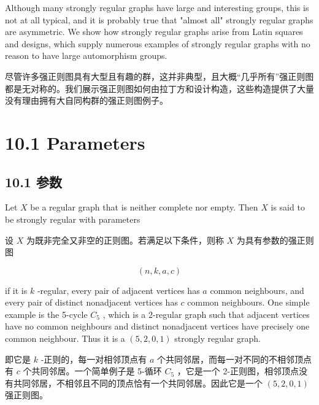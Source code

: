 \documentclass[10pt]{article}
\begin{document}
Although many strongly regular graphs have large and interesting groups, this is not at all typical, and it is probably true that "almost all" strongly regular graphs are asymmetric. We show how strongly regular graphs arise from Latin squares and designs, which supply numerous examples of strongly regular graphs with no reason to have large automorphism groups.

\begin{tcolorbox}\relax
尽管许多强正则图具有大型且有趣的群，这并非典型，且大概“几乎所有”强正则图都是无对称的。我们展示强正则图如何由拉丁方和设计构造，这些构造提供了大量没有理由拥有大自同构群的强正则图例子。
\end{tcolorbox}

\section*{10.1 Parameters}

\begin{tcolorbox}\relax
\section*{10.1 参数}
\end{tcolorbox}

Let \(X\) be a regular graph that is neither complete nor empty. Then \(X\) is said to be strongly regular with parameters

\begin{tcolorbox}\relax
设 \(X\) 为既非完全又非空的正则图。若满足以下条件，则称 \(X\) 为具有参数的强正则图
\end{tcolorbox}

\[
\left( {n,k,a,c}\right)
\]

if it is \(k\) -regular, every pair of adjacent vertices has \(a\) common neighbours, and every pair of distinct nonadjacent vertices has \(c\) common neighbours. One simple example is the 5-cycle \({C}_{5}\) , which is a 2-regular graph such that adjacent vertices have no common neighbours and distinct nonadjacent vertices have precisely one common neighbour. Thus it is a \(\left( {5,2,0,1}\right)\) strongly regular graph.

\begin{tcolorbox}\relax
即它是 \(k\) -正则的，每一对相邻顶点有 \(a\) 个共同邻居，而每一对不同的不相邻顶点有 \(c\) 个共同邻居。一个简单例子是 5-循环 \({C}_{5}\) ，它是一个 2-正则图，相邻顶点没有共同邻居，不相邻且不同的顶点恰有一个共同邻居。因此它是一个 \(\left( {5,2,0,1}\right)\) 强正则图。
\end{tcolorbox}
\end{document}
